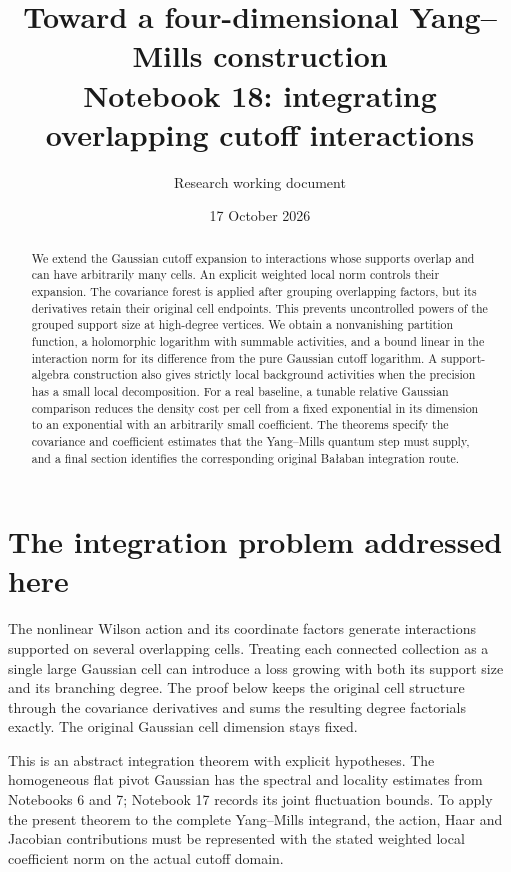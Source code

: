 \documentclass[11pt]{article}
\title{Toward a four-dimensional Yang--Mills construction\\
\large Notebook 18: integrating overlapping cutoff interactions}
\author{Research working document}
\date{17 October 2026}
\theoremstyle{remark}
\begin{document}
\maketitle
\begin{abstract}
We extend the Gaussian cutoff expansion to interactions whose
supports overlap and can have arbitrarily many cells. An explicit
weighted local norm controls their expansion. The covariance forest
is applied after grouping overlapping factors, but its derivatives
retain their original cell endpoints. This prevents uncontrolled
powers of the grouped support size at high-degree vertices. We
obtain a nonvanishing partition function, a holomorphic logarithm
with summable activities, and a bound linear in the interaction norm
for its difference from the pure Gaussian cutoff logarithm.
A support-algebra construction also gives strictly local background
activities when the precision has a small local decomposition.
For a real baseline, a tunable relative Gaussian comparison reduces
the density cost per cell from a fixed exponential in its dimension
to an exponential with an arbitrarily small coefficient. The
theorems specify the covariance and coefficient estimates that
the Yang--Mills quantum step must supply, and a final section
identifies the corresponding original Ba\l aban integration route.
\end{abstract}

\section{The integration problem addressed here}
\label{oc18-target}

The nonlinear Wilson action and its coordinate factors generate
interactions supported on several overlapping cells. Treating each
connected collection as a single large Gaussian cell can introduce
a loss growing with both its support size and its branching degree.
The proof below keeps the original cell structure through the
covariance derivatives and sums the resulting degree factorials
exactly. The original Gaussian cell dimension stays fixed.

This is an abstract integration theorem with explicit hypotheses.
The homogeneous flat pivot Gaussian has the spectral and locality
estimates from Notebooks 6 and 7; Notebook 17 records its joint
fluctuation bounds. To apply the present theorem to the complete
Yang--Mills integrand, the action, Haar and Jacobian contributions
must be represented with the stated weighted local coefficient
norm on the actual cutoff domain.
\end{document}
